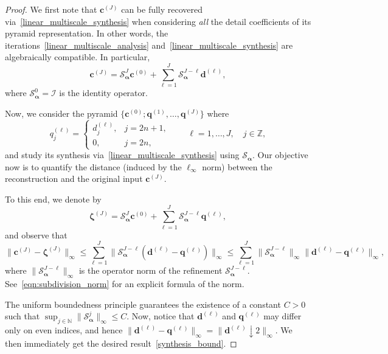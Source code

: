 \documentclass[10pt,a4paper]{amsart}
\begin{document}
\begin{proof}
    We first note that $\boldsymbol{c}^{(J)}$ can be fully recovered via~\eqref{linear_multiscale_synthesis} when considering \emph{all} the detail coefficients of its pyramid representation. In other words, the iterations~\eqref{linear_multiscale_analysis} and~\eqref{linear_multiscale_synthesis} are algebraically compatible. In particular,
    \begin{equation*}
        \boldsymbol{c}^{(J)}=\mathcal{S}_{\boldsymbol{\alpha}}^{J}\boldsymbol{c}^{(0)} + \sum_{\ell=1}^J\mathcal{S}_{\boldsymbol{\alpha}}^{J-\ell}\boldsymbol{d}^{(\ell)},
    \end{equation*}
    where $\mathcal{S}_{\boldsymbol{\alpha}}^0=\mathcal{I}$ is the identity operator.

    Now, we consider the pyramid $\{\boldsymbol{c}^{(0)};\boldsymbol{q}^{(1)},\dots,\boldsymbol{q}^{(J)}\}$ where
    \begin{equation*}
        q^{(\ell)}_{j}=\begin{cases}
            d^{(\ell)}_j, & j=2n+1, \\
            0, & j=2n,
            \end{cases} \quad \quad\ell=1,\dots, J, \quad j\in\mathbb{Z},
    \end{equation*}
    and study its synthesis via~\eqref{linear_multiscale_synthesis} using $\mathcal{S}_{\boldsymbol{\alpha}}$. Our objective now is to quantify the distance (induced by the $\ell_\infty$ norm) between the reconstruction and the original input $\boldsymbol{c}^{(J)}$.

    To this end, we denote by 
    \begin{equation*}
        \boldsymbol{\zeta}^{(J)}=\mathcal{S}_{\boldsymbol{\alpha}}^{J}\boldsymbol{c}^{(0)} + \sum_{\ell=1}^J\mathcal{S}_{\boldsymbol{\alpha}}^{J-\ell}\boldsymbol{q}^{(\ell)},
    \end{equation*}
    and observe that
    \begin{equation*}
        \|\boldsymbol{c}^{(J)}-\boldsymbol{\zeta}^{(J)}\|_\infty \leq \sum_{\ell=1}^J\|\mathcal{S}_{\boldsymbol{\alpha}}^{J-\ell}(\boldsymbol{d}^{(\ell)}-\boldsymbol{q}^{(\ell)})\|_\infty \leq \sum_{\ell=1}^J\|\mathcal{S}_{\boldsymbol{\alpha}}^{J-\ell}\|_{\infty}\|\boldsymbol{d}^{(\ell)}-\boldsymbol{q}^{(\ell)}\|_\infty,
    \end{equation*}
    where $\|\mathcal{S}_{\boldsymbol{\alpha}}^{J-\ell}\|_{\infty}$ is the operator norm of the refinement $\mathcal{S}_{\boldsymbol{\alpha}}^{J-\ell}$. See~\eqref{eqn:subdivision_norm} for an explicit formula of the norm.

    The uniform boundedness principle guarantees the existence of a constant $C>0$ such that $\sup_{j\in\mathbb{N}} \|\mathcal{S}_{\boldsymbol{\alpha}}^j\|_{\infty}\leq C$. Now, notice that $\boldsymbol{d}^{(\ell)}$ and $\boldsymbol{q}^{(\ell)}$ may differ only on even indices, and hence $\|\boldsymbol{d}^{(\ell)}-\boldsymbol{q}^{(\ell)}\|_\infty=\|\boldsymbol{d}^{(\ell)}\downarrow 2\|_\infty$. We then immediately get the desired result~\eqref{synthesis_bound}.
\end{proof}
\end{document}
